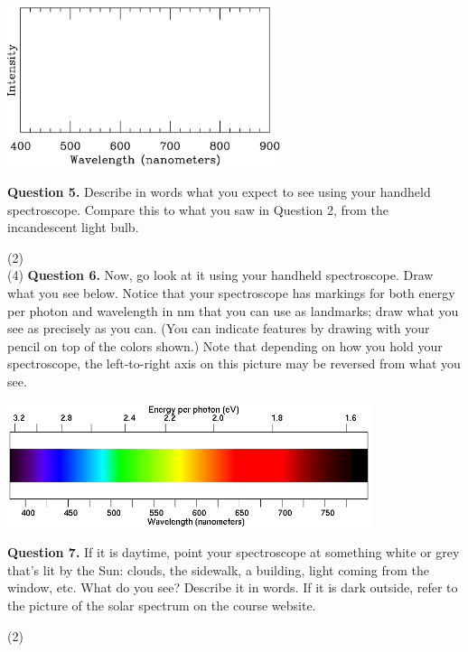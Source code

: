 \documentclass[11pt]{article}
\begin{document}
\begin{center}
	\includegraphics[width=0.6\textwidth]{spectrumplot-blank.pdf}
\end{center}

\textbf{Question 5.} Describe in words what you expect to see using your handheld spectroscope. Compare this to what you saw in Question 2, from the incandescent light bulb.

\vspace{1.5cm}
(2) \hrulefill\\


(4) \textbf{Question 6.} Now, go look at it using your handheld spectroscope. Draw what you see below. Notice that your spectroscope has markings for both energy per photon and wavelength in nm that you can use as landmarks; draw what you see as precisely as you can. (You
can indicate features by drawing with your pencil on top of the colors shown.) Note that depending on how you hold your spectroscope, the left-to-right axis on this picture may be reversed from what you see.

\begin{center}
	\includegraphics[width=0.8\textwidth]{spectrum2.png}
\end{center}
\newpage
\textbf{Question 7.} If it is daytime, point your spectroscope at something white or grey that's lit by the Sun: clouds, the sidewalk, a building, light coming from the window, etc. What do you see? Describe it in words. If it is dark outside, refer to the picture of 
the solar spectrum on the course website.


\vspace{1.5cm}
(2) \hrulefill\\
\end{document}
